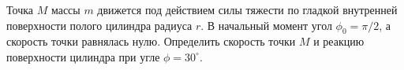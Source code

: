 Точка $M$ массы $m$ движется под действием силы тяжести по гладкой
внутренней поверхности полого цилиндра радиуса $r$.
В начальный момент угол $\phi_{0}=\pi/2$, а скорость точки равнялась
нулю. Определить скорость точки $M$ и реакцию поверхности цилиндра при
угле $\phi=30^{\circ}$.
